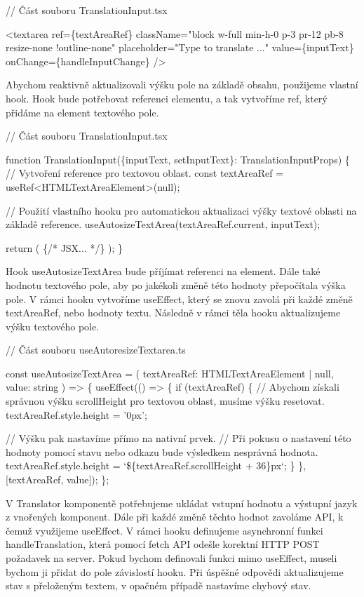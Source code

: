 \begin{prog}
// Část souboru TranslationInput.tsx

<textarea
  ref=\{textAreaRef\}
  className="block w-full min-h-0 p-3 pr-12 pb-8 resize-none !outline-none"
  placeholder="Type to translate ..."
  value=\{inputText\}
  onChange=\{handleInputChange\}
/>
\end{prog}

Abychom reaktivně aktualizovali výšku pole na základě obsahu, použijeme vlastní hook. 
Hook bude potřebovat referenci elementu, a tak vytvoříme ref, který přidáme na element textového pole.

\begin{prog}
// Část souboru TranslationInput.tsx

function TranslationInput(\{inputText, setInputText\}: TranslationInputProps) \{
  // Vytvoření reference pro textovou oblast.
  const textAreaRef = useRef<HTMLTextAreaElement>(null);

  // Použití vlastního hooku pro automatickou aktualizaci výšky
    textové oblasti na základě reference.
  useAutosizeTextArea(textAreaRef.current, inputText);

  return (
    \{/* JSX... */\}
  );
\}
\end{prog}

Hook useAutosizeTextArea bude příjímat referenci na element. Dále také hodnotu textového pole, aby po jakékoli změně této hodnoty přepočítala výška pole. 
V rámci hooku vytvoříme useEffect, který se znovu zavolá při každé změně textAreaRef, nebo hodnoty textu. Následně v rámci těla hooku aktualizujeme výšku textového pole.

\begin{prog}
// Část souboru useAutoresizeTextarea.ts

const useAutosizeTextArea = (
  textAreaRef: HTMLTextAreaElement | null, value: string
) => \{
  useEffect(() => \{
    if (textAreaRef) \{
      // Abychom získali správnou výšku scrollHeight 
        pro textovou oblast, musíme výšku resetovat.
      textAreaRef.style.height = '0px';

      // Výšku pak nastavíme přímo na nativní prvek.
      // Při pokusu o nastavení této hodnoty pomocí stavu 
        nebo odkazu bude výsledkem nesprávná hodnota.
      textAreaRef.style.height = `\$\{textAreaRef.scrollHeight + 36\}px`;
    \}
  \}, [textAreaRef, value]);
\};
\end{prog}

V Translator komponentě potřebujeme ukládat vstupní hodnotu a výstupní jazyk z vnořených komponent. Dále při každé změně těchto hodnot zavoláme API, k čemuž využijeme useEffect.
V rámci hooku definujeme asynchronní funkci handleTranslation, která pomocí fetch API odešle korektní HTTP POST požadavek na server. 
Pokud bychom definovali funkci mimo useEffect, museli bychom ji přidat do pole závislostí hooku.
Při úspěšné odpovědi aktualizujeme stav s přeloženým textem, v opačném případě nastavíme chybový stav.

